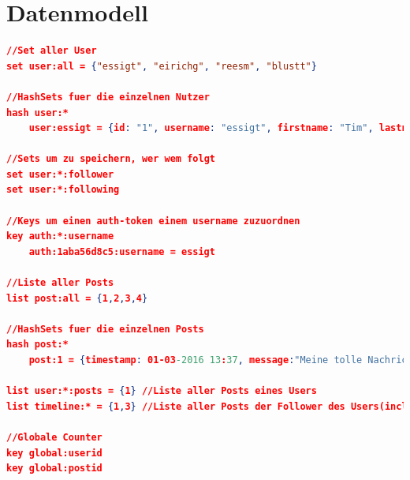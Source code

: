 \documentclass[
    a4paper
]{scrreprt}
\begin{document}
%		
		
		\section{Datenmodell}

		
		\begin{lstlisting}[language=json]
//Set aller User
set user:all = {"essigt", "eirichg", "reesm", "blustt"}

//HashSets fuer die einzelnen Nutzer
hash user:*
	user:essigt = {id: "1", username: "essigt", firstname: "Tim", lastname: "Essig", password: "xyz", auth: "1aba56d8c5"}

//Sets um zu speichern, wer wem folgt
set user:*:follower
set user:*:following

//Keys um einen auth-token einem username zuzuordnen
key auth:*:username
	auth:1aba56d8c5:username = essigt

//Liste aller Posts
list post:all = {1,2,3,4}

//HashSets fuer die einzelnen Posts
hash post:*
	post:1 = {timestamp: 01-03-2016 13:37, message:"Meine tolle Nachricht", user:"essigt"}

list user:*:posts = {1} //Liste aller Posts eines Users
list timeline:* = {1,3} //Liste aller Posts der Follower des Users(incl. seiner eigenen)

//Globale Counter
key global:userid
key global:postid
		\end{lstlisting}
	



\end{document}
